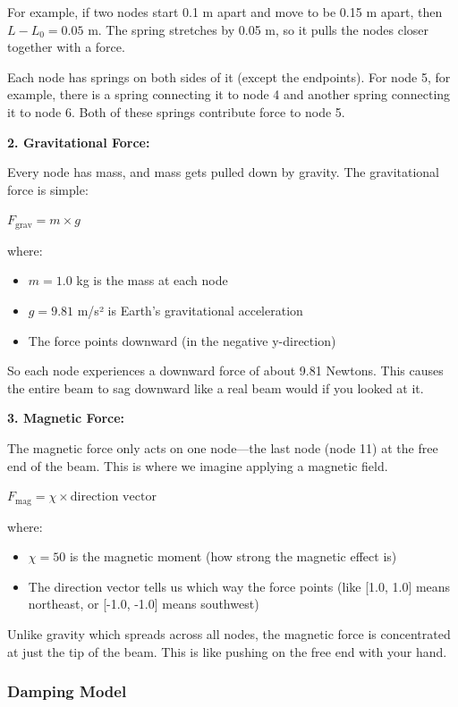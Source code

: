 \documentclass[11pt]{article}
\begin{document}
For example, if two nodes start 0.1 m apart and move to be 0.15 m apart, then \(L - L_0 = 0.05\) m. The spring stretches by 0.05 m, so it pulls the nodes closer together with a force.

Each node has springs on both sides of it (except the endpoints). For node 5, for example, there is a spring connecting it to node 4 and another spring connecting it to node 6. Both of these springs contribute force to node 5.

\textbf{2. Gravitational Force:}

Every node has mass, and mass gets pulled down by gravity. The gravitational force is simple:

\(F_{\text{grav}} = m \times g\)

where:
\begin{itemize}
\item \(m = 1.0\) kg is the mass at each node
\item \(g = 9.81\) m/s² is Earth's gravitational acceleration
\item The force points downward (in the negative y-direction)
\end{itemize}

So each node experiences a downward force of about 9.81 Newtons. This causes the entire beam to sag downward like a real beam would if you looked at it.

\textbf{3. Magnetic Force:}

The magnetic force only acts on one node—the last node (node 11) at the free end of the beam. This is where we imagine applying a magnetic field.

\(F_{\text{mag}} = \chi \times \text{direction vector}\)

where:
\begin{itemize}
\item \(\chi = 50\) is the magnetic moment (how strong the magnetic effect is)
\item The direction vector tells us which way the force points (like [1.0, 1.0] means northeast, or [-1.0, -1.0] means southwest)
\end{itemize}

Unlike gravity which spreads across all nodes, the magnetic force is concentrated at just the tip of the beam. This is like pushing on the free end with your hand.
\subsubsection{Damping Model}
\label{sec:org300a366}
\end{document}
